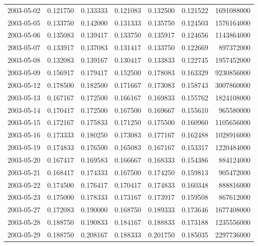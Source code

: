 \begin{tabular}{lrrrrrr}
2003-05-02 &    0.121750 &    0.133333 &    0.121083 &    0.132500 &    0.121522 &  1691088000 \\
2003-05-05 &    0.133750 &    0.142000 &    0.131333 &    0.135750 &    0.124503 &  1576164000 \\
2003-05-06 &    0.135083 &    0.139417 &    0.133750 &    0.135917 &    0.124656 &  1143864000 \\
2003-05-07 &    0.133917 &    0.137083 &    0.131417 &    0.133750 &    0.122669 &   897372000 \\
2003-05-08 &    0.132083 &    0.139167 &    0.130417 &    0.133833 &    0.122745 &  1957452000 \\
2003-05-09 &    0.156917 &    0.179417 &    0.152500 &    0.178083 &    0.163329 &  9230856000 \\
2003-05-12 &    0.178500 &    0.182500 &    0.171667 &    0.173083 &    0.158743 &  3007860000 \\
2003-05-13 &    0.167167 &    0.172500 &    0.166167 &    0.169833 &    0.155762 &  1824108000 \\
2003-05-14 &    0.170417 &    0.172500 &    0.167500 &    0.169667 &    0.155610 &   965580000 \\
2003-05-15 &    0.172167 &    0.175833 &    0.171250 &    0.175500 &    0.160960 &  1105656000 \\
2003-05-16 &    0.173333 &    0.180250 &    0.173083 &    0.177167 &    0.162488 &  1028916000 \\
2003-05-19 &    0.174833 &    0.176500 &    0.165083 &    0.167167 &    0.153317 &  1220484000 \\
2003-05-20 &    0.167417 &    0.169583 &    0.166667 &    0.168333 &    0.154386 &   884124000 \\
2003-05-21 &    0.168417 &    0.174333 &    0.167500 &    0.174250 &    0.159813 &   905472000 \\
2003-05-22 &    0.174500 &    0.176417 &    0.170417 &    0.174833 &    0.160348 &   888816000 \\
2003-05-23 &    0.175000 &    0.178333 &    0.173167 &    0.173917 &    0.159508 &   867612000 \\
2003-05-27 &    0.172083 &    0.190000 &    0.168750 &    0.189333 &    0.173646 &  1677408000 \\
2003-05-28 &    0.188750 &    0.190833 &    0.184167 &    0.188833 &    0.173188 &  1235556000 \\
2003-05-29 &    0.188750 &    0.208167 &    0.188333 &    0.201750 &    0.185035 &  2297736000 \\

\end{tabular}
